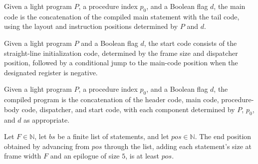 \begin{definition}
\label{Light.Compiler.mainCode}
\leanok
{}
Given a light program $P$, a procedure index $p_0$, and a Boolean flag $d$, the main
code is the concatenation of the compiled main statement with the tail code, using the
layout and instruction positions determined by $P$ and $d$.
\end{definition}

\begin{definition}
\label{Light.Compiler.startCode}
\leanok
{}
Given a light program $P$ and a Boolean flag $d$, the start code consists of the
straight-line initialization code, determined by the frame size and dispatcher position,
followed by a conditional jump to the main-code position when the designated register is
negative.
\end{definition}

\begin{definition}
\label{Light.compileProgram}
\leanok
{}
Given a light program $P$, a procedure index $p_0$, and a Boolean flag $d$, the compiled
program is the concatenation of the header code, main code, procedure-body code,
dispatcher, and start code, with each component determined by $P$, $p_0$, and $d$ as
appropriate.
\end{definition}

\begin{theorem}
\label{Light.Compiler.le_endPos}
\leanok
{}
Let $F\in\mathbb{N}$, let $bs$ be a finite list of statements, and let
$pos\in\mathbb{N}$. The end position obtained by advancing from $pos$ through the list,
adding each statement's size at frame width $F$ and an epilogue of size $5$, is at least
$pos$.
\end{theorem}

